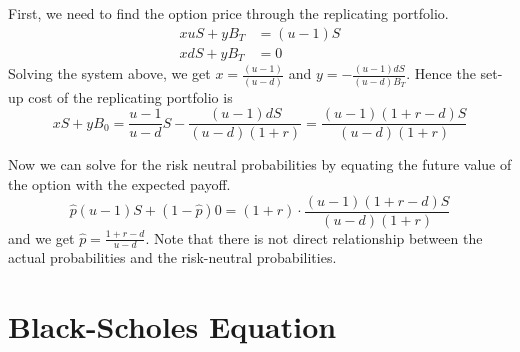 \documentclass{article}
\begin{document}
First, we need to find the option price through the replicating portfolio.
\begin{align*}
    xuS + yB_T &= (u-1)S\\
    xdS + yB_T &= 0
\end{align*}
Solving the system above, we get $x = \frac{(u-1)}{(u-d)}$ and $y = -
\frac{(u-1)dS}{(u-d)B_T}$. Hence the set-up cost of the replicating portfolio is $$xS + y B_0 = \frac{u-1}{u-d}S - \frac{(u-1)dS}{(u-d)(1+r)} = \frac{(u-1) (1+r-d)S}{(u-d)(1+r)}$$

Now we can solve for the risk neutral probabilities by equating the future value of the option with the expected payoff. $$\hat{p}(u-1)S + (1-\hat{p})0 = (1+r)\cdot \frac{(u-1) (1+r-d)S}{(u-d)(1+r)}$$
and we get $\hat{p} = \frac{1+r-d}{u-d}$. Note that there is not direct relationship between the actual probabilities and the risk-neutral probabilities.
\section{Black-Scholes Equation}
\
\end{document}
